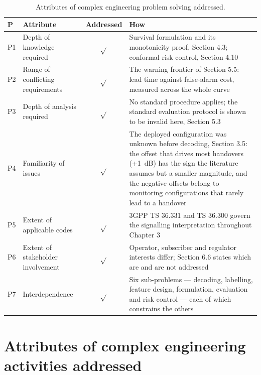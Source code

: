 \begin{table}[H]
\centering
\caption{Attributes of complex engineering problem solving addressed.}
\label{tab:6_4}
\vspace{0.4em}
\singlespacing
\small
\begin{tabularx}{\linewidth}{l >{\raggedright\arraybackslash}p{4.2cm} c X}
\toprule
\textbf{P} & \textbf{Attribute} & \textbf{Addressed} & \textbf{How} \\
\midrule
P1 & Depth of knowledge required & $\sqrt{}$ & Survival formulation and its monotonicity proof, Section 4.3; conformal risk control, Section 4.10 \\
P2 & Range of conflicting requirements & $\sqrt{}$ & The warning frontier of Section 5.5: lead time against false-alarm cost, measured across the whole curve \\
P3 & Depth of analysis required & $\sqrt{}$ & No standard procedure applies; the standard evaluation protocol is shown to be invalid here, Section 5.3 \\
P4 & Familiarity of issues & $\sqrt{}$ & The deployed configuration was unknown before decoding, Section 3.5: the offset that drives most handovers (+1~dB) has the sign the literature assumes but a smaller magnitude, and the negative offsets belong to monitoring configurations that rarely lead to a handover \\
P5 & Extent of applicable codes & $\sqrt{}$ & 3GPP TS 36.331 and TS 36.300 govern the signalling interpretation throughout Chapter 3 \\
P6 & Extent of stakeholder involvement & $\sqrt{}$ & Operator, subscriber and regulator interests differ; Section 6.6 states which are and are not addressed \\
P7 & Interdependence & $\sqrt{}$ & Six sub-problems --- decoding, labelling, feature design, formulation, evaluation and risk control --- each of which constrains the others \\
\bottomrule
\end{tabularx}
\end{table}

\clearpage
\enlargethispage{2.5\baselineskip}
\section{Attributes of complex engineering activities addressed}
\label{sec:6_8}


